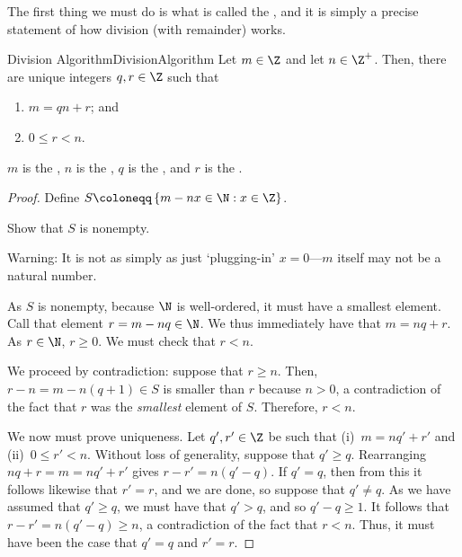 The first thing we must do is what is called the , and it is simply a precise statement of how division (with remainder) works.
\begin{thm}{Division Algorithm}{DivisionAlgorithm}
Let $m\in \Z$ and let $n\in \Z ^+$.  Then, there are unique integers $q,r\in \Z$ such that
\begin{enumerate}
\item $m=qn+r$; and
\item $0\leq r<n$.
\end{enumerate}
\begin{rmk}
$m$ is the , $n$ is the , $q$ is the , and $r$ is the .
\end{rmk}
\begin{proof}
Define $S\coloneqq \left\{ m-nx\in \N :x\in \Z\right\}$.
\begin{exr}{}{}
Show that $S$ is nonempty.
\begin{wrn}
Warning:  It is not as simply as just `plugging-in' $x=0$---$m$ itself may not be a natural number.
\end{wrn}
\end{exr}
As $S$ is nonempty, because $\N$ is well-ordered, it must have a smallest element.  Call that element $r=m-nq\in \N$.  We thus immediately have that $m=nq+r$.  As $r\in \N$, $r\geq 0$.  We must check that $r<n$.

We proceed by contradiction:  suppose that $r\geq n$.  Then, $r-n=m-n(q+1)\in S$ is smaller than $r$ because $n>0$, a contradiction of the fact that $r$ was the \emph{smallest} element of $S$.  Therefore, $r<n$.

We now must prove uniqueness.  Let $q',r'\in \Z$ be such that (i)~$m=nq'+r'$ and (ii)~$0\leq r'<n$.  Without loss of generality, suppose that $q'\geq q$.  Rearranging $nq+r=m=nq'+r'$ gives $r-r'=n(q'-q)$.  If $q'=q$, then from this it follows likewise that $r'=r$, and we are done, so suppose that $q'\neq q$.  As we have assumed that $q'\geq q$, we must have that $q'>q$, and so $q'-q\geq 1$.  It follows that $r-r'=n(q'-q)\geq n$, a contradiction of the fact that $r<n$.  Thus, it must have been the case that $q'=q$ and $r'=r$.
\end{proof}
\end{thm}

